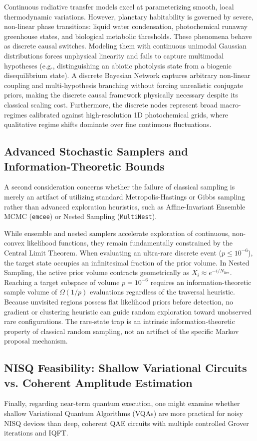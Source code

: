 Continuous radiative transfer models excel at parameterizing smooth, local thermodynamic variations. However, planetary habitability is governed by severe, non-linear phase transitions: liquid water condensation, photochemical runaway greenhouse states, and biological metabolic thresholds. These phenomena behave as discrete causal switches. Modeling them with continuous unimodal Gaussian distributions forces unphysical linearity and fails to capture multimodal hypotheses (e.g., distinguishing an abiotic photolysis state from a biogenic disequilibrium state). A discrete Bayesian Network captures arbitrary non-linear coupling and multi-hypothesis branching without forcing unrealistic conjugate priors, making the discrete causal framework physically necessary despite its classical scaling cost. Furthermore, the discrete nodes represent broad macro-regimes calibrated against high-resolution 1D photochemical grids, where qualitative regime shifts dominate over fine continuous fluctuations.

\subsection{Advanced Stochastic Samplers and Information-Theoretic Bounds}
A second consideration concerns whether the failure of classical sampling is merely an artifact of utilizing standard Metropolis-Hastings or Gibbs sampling rather than advanced exploration heuristics, such as Affine-Invariant Ensemble MCMC (\texttt{emcee}) or Nested Sampling (\texttt{MultiNest}).

While ensemble and nested samplers accelerate exploration of continuous, non-convex likelihood functions, they remain fundamentally constrained by the Central Limit Theorem. When evaluating an ultra-rare discrete event ($p \le 10^{-6}$), the target state occupies an infinitesimal fraction of the prior volume. In Nested Sampling, the active prior volume contracts geometrically as $X_i \approx e^{-i / N_{\mathrm{live}}}$. Reaching a target subspace of volume $p = 10^{-6}$ requires an information-theoretic sample volume of $\Omega(1/p)$ evaluations regardless of the traversal heuristic. Because unvisited regions possess flat likelihood priors before detection, no gradient or clustering heuristic can guide random exploration toward unobserved rare configurations. The rare-state trap is an intrinsic information-theoretic property of classical random sampling, not an artifact of the specific Markov proposal mechanism.

\subsection{NISQ Feasibility: Shallow Variational Circuits vs. Coherent Amplitude Estimation}
Finally, regarding near-term quantum execution, one might examine whether shallow Variational Quantum Algorithms (VQAs) are more practical for noisy NISQ devices than deep, coherent QAE circuits with multiple controlled Grover iterations and IQFT.

